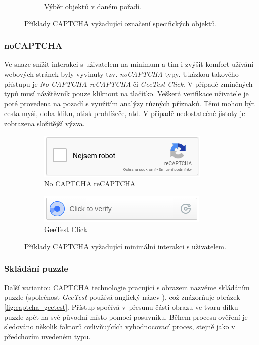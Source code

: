 \documentclass[
  field=ainfp,
  master=true,
  biblatex,
  sourcecodes=false,
  theorems=false,
  glossaries,
  index
]{kidiplom}
\begin{document}
\begin{figure}[H]
\begin{subfigure}[b]{.5\textwidth}
  \caption{Výběr objektů v daném pořadí.}  \label{fig:geetest_selection}
\end{subfigure}
\caption{Příklady CAPTCHA vyžadující označení specifických objektů.}
\label{fig:image_selection}
\end{figure}

\subsubsection*{noCAPTCHA}
Ve snaze snížit interakci s uživatelem na minimum a tím i zvýšit komfort užívání webových stránek byly vyvinuty tzv. \textit{noCAPTCHA} typy. 
Ukázkou takového přístupu je \textit{No CAPTCHA reCAPTCHA} či \textit{GeeTest Click}. V případě zmíněných typů musí návštěvník pouze kliknout na tlačítko. Veškerá verifikace uživatele je poté provedena na pozadí s využitím analýzy různých příznaků. Těmi mohou být cesta myši, doba kliku, otisk prohlížeče, atd. V případě nedostatečné jistoty je zobrazena složitější výzva.

\begin{figure}[H]
\centering
\begin{subfigure}[b]{.5\textwidth}
  \centering
  \includegraphics[width=.8\linewidth]{images/nocaptcha.png}
  \caption{No CAPTCHA reCAPTCHA}
  \label{fig:sub1}
\end{subfigure}%
\begin{subfigure}[b]{.5\textwidth}
  \centering
  \includegraphics[width=.8\linewidth]{images/geetest_click.png}
  \caption{GeeTest Click}
  \label{fig:sub2}
\end{subfigure}
\caption{Příklady CAPTCHA vyžadující minimální interakci s uživatelem.}
\label{fig:test}
\end{figure}

\subsubsection*{Skládání puzzle}
Další variantou CAPTCHA technologie pracující s obrazem nazvěme skládáním puzzle (společnost \textit{GeeTest} používá anglický název ), což znázorňuje obrá\-zek \ref{fig:captcha_geetest}. Přístup spočívá v~přesunu části obrazu ve tvaru dílku puzzle zpět na své původní místo pomocí posuvníku. Během procesu ověření je sledováno několik faktorů ovlivňujících vyhodnocovací proces, stejně jako v předchozím uvedeném typu.
\end{document}
